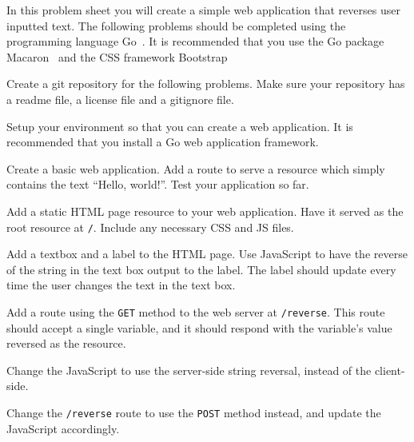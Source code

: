 
\noindent
In this problem sheet you will create a simple web application that reverses user inputted text. 
The following problems should be completed using the programming language Go~\cite{gowebsite}.
It is recommended that you use the Go package Macaron~\cite{macaronwebsite} and the CSS framework Bootstrap~\cite{bootstrapwebsite}


\begin{questions}


\question
Create a git repository for the following problems.
Make sure your repository has a readme file, a license file and a gitignore file. 


\question
Setup your environment so that you can create a web application.
It is recommended that you install a Go web application framework.


\question
Create a basic web application.
Add a route to serve a resource which simply contains the text ``Hello, world!''.
Test your application so far.


\question
Add a static HTML page resource to your web application.
Have it served as the root resource at \texttt{/}.
Include any necessary CSS and JS files.


\question
Add a textbox and a label to the HTML page.
Use JavaScript to have the reverse of the string in the text box output to the label.
The label should update every time the user changes the text in the text box.


\question
Add a route using the \texttt{GET} method to the web server at \texttt{/reverse}.
This route should accept a single variable, and it should respond with the variable's value reversed as the resource.


\question
Change the JavaScript to use the server-side string reversal, instead of the client-side. 


\question
Change the \texttt{/reverse} route to use the \texttt{POST} method instead, and update the JavaScript accordingly.


\end{questions}
